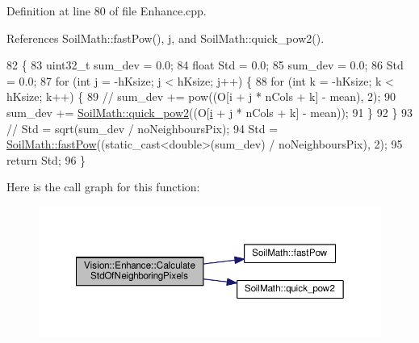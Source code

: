 Definition at line 80 of file Enhance.\+cpp.



References Soil\+Math\+::fast\+Pow(), j, and Soil\+Math\+::quick\+\_\+pow2().


\begin{DoxyCode}
82                                                            \{
83   uint32\_t sum\_dev = 0.0;
84   \textcolor{keywordtype}{float} Std = 0.0;
85   sum\_dev = 0.0;
86   Std = 0.0;
87   \textcolor{keywordflow}{for} (\textcolor{keywordtype}{int} \hyperlink{_comparision_pictures_2_createtest_image_8m_ac86694252f8dfdb19aaeadc4b7c342c6}{j} = -hKsize; \hyperlink{_comparision_pictures_2_createtest_image_8m_ac86694252f8dfdb19aaeadc4b7c342c6}{j} < hKsize; \hyperlink{_comparision_pictures_2_createtest_image_8m_ac86694252f8dfdb19aaeadc4b7c342c6}{j}++) \{
88     \textcolor{keywordflow}{for} (\textcolor{keywordtype}{int} k = -hKsize; k < hKsize; k++) \{
89       \textcolor{comment}{// sum\_dev += pow((O[i + j * nCols + k] - mean), 2);}
90       sum\_dev += \hyperlink{namespace_soil_math_a69d186af0e164a5f98c42985aabec919}{SoilMath::quick\_pow2}((O[\hyperlink{_comparision_pictures_2_createtest_image_8m_a6f6ccfcf58b31cb6412107d9d5281426}{i} + \hyperlink{_comparision_pictures_2_createtest_image_8m_ac86694252f8dfdb19aaeadc4b7c342c6}{j} * nCols + k] - mean));
91     \}
92   \}
93   \textcolor{comment}{// Std = sqrt(sum\_dev / noNeighboursPix);}
94   Std = \hyperlink{namespace_soil_math_ab3886ae2a670a717bbe01f94543922a0}{SoilMath::fastPow}((static\_cast<double>(sum\_dev) / noNeighboursPix), 2);
95   \textcolor{keywordflow}{return} Std;
96 \}
\end{DoxyCode}


Here is the call graph for this function\+:\nopagebreak
\begin{figure}[H]
\begin{center}
\leavevmode
\includegraphics[width=350pt]{class_vision_1_1_enhance_ac03740bd6b3cd2936a579644c9646ce0_cgraph}
\end{center}
\end{figure}


